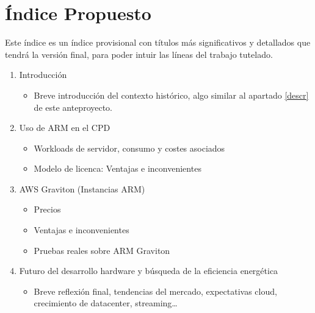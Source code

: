 \documentclass[a4paper,openright,12pt]{article}
\begin{document}
\section{Índice Propuesto}
Este índice es un índice provisional con títulos más significativos y detallados que tendrá la versión final, para poder intuir las líneas del trabajo tutelado.
\begin{enumerate}[1.]
\item Introducción
\begin{itemize}
    \item Breve introducción del contexto histórico, algo similar al apartado \ref{descr} de este anteproyecto.
\end{itemize}

\item Uso de ARM en el CPD
\begin{itemize}
    \item Workloads de servidor, consumo y costes asociados
    \item Modelo de licenca: Ventajas e inconvenientes
\end{itemize}

\item AWS Graviton (Instancias ARM)
\begin{itemize}
    \item Precios
    \item Ventajas e inconvenientes
    \item Pruebas reales sobre ARM Graviton
\end{itemize}

\item Futuro del desarrollo hardware y búsqueda de la eficiencia energética
\begin{itemize}
    \item Breve reflexión final, tendencias del mercado, expectativas cloud, crecimiento de datacenter, streaming\ldots
\end{itemize}
    
\end{enumerate}

\clearpage
\end{document}
